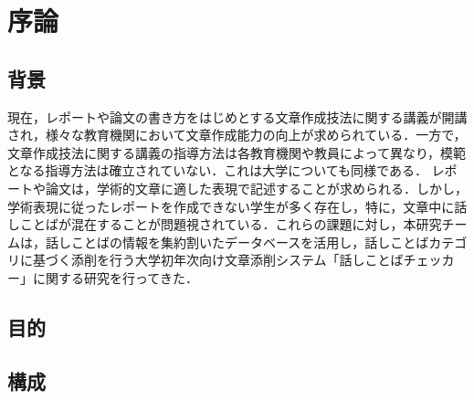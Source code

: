 \chapter{序論\label{c1}}

\section{背景}
現在，レポートや論文の書き方をはじめとする文章作成技法に関する講義が開講され，様々な教育機関において文章作成能力の向上が求められている．一方で，文章作成技法に関する講義の指導方法は各教育機関や教員によって異なり，模範となる指導方法は確立されていない．これは大学についても同様である．
レポートや論文は，学術的文章に適した表現で記述することが求められる．しかし，学術表現に従ったレポートを作成できない学生が多く存在し，特に，文章中に話しことばが混在することが問題視されている．これらの課題に対し，本研究チームは，話しことばの情報を集約割いたデータベースを活用し，話しことばカテゴリに基づく添削を行う大学初年次向け文章添削システム「話しことばチェッカー」に関する研究を行ってきた．


\section{目的}


\section{構成}


